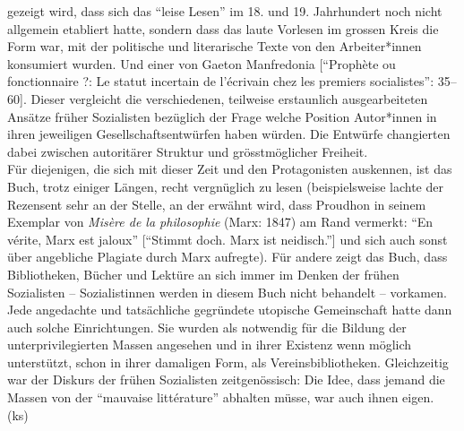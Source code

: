 \documentclass[a4paper,
fontsize=11pt,
oneside,
numbers=noperiodatend,
parskip=half-,
bibliography=totoc,
final
]{scrartcl}
\begin{document}
gezeigt wird, dass sich das ``leise Lesen'' im 18. und 19. Jahrhundert
noch nicht allgemein etabliert hatte, sondern dass das laute Vorlesen im
grossen Kreis die Form war, mit der politische und literarische Texte
von den Arbeiter*innen konsumiert wurden. Und einer von Gaeton
Manfredonia {[}``Prophète ou fonctionnaire ?: Le statut incertain de
l'écrivain chez les premiers socialistes'': 35--60{]}. Dieser vergleicht
die verschiedenen, teilweise erstaunlich ausgearbeiteten Ansätze früher
Sozialisten bezüglich der Frage welche Position Autor*innen in ihren
jeweiligen Gesellschaftsentwürfen haben würden. Die Entwürfe changierten
dabei zwischen autoritärer Struktur und grösstmöglicher Freiheit.\\
Für diejenigen, die sich mit dieser Zeit und den Protagonisten
auskennen, ist das Buch, trotz einiger Längen, recht vergnüglich zu
lesen (beispielsweise lachte der Rezensent sehr an der Stelle, an der
erwähnt wird, dass Proudhon in seinem Exemplar von \emph{Misère de la
philosophie} (Marx: 1847) am Rand vermerkt: ``En vérite, Marx est
jaloux'' {[}``Stimmt doch. Marx ist neidisch.''{]} und sich auch sonst
über angebliche Plagiate durch Marx aufregte). Für andere zeigt das
Buch, dass Bibliotheken, Bücher und Lektüre an sich immer im Denken der
frühen Sozialisten -- Sozialistinnen werden in diesem Buch nicht
behandelt -- vorkamen. Jede angedachte und tatsächliche gegründete
utopische Gemeinschaft hatte dann auch solche Einrichtungen. Sie wurden
als notwendig für die Bildung der unterprivilegierten Massen angesehen
und in ihrer Existenz wenn möglich unterstützt, schon in ihrer damaligen
Form, als Vereinsbibliotheken. Gleichzeitig war der Diskurs der frühen
Sozialisten zeitgenössisch: Die Idee, dass jemand die Massen von der
``mauvaise littérature'' abhalten müsse, war auch ihnen eigen. (ks)
\end{document}
